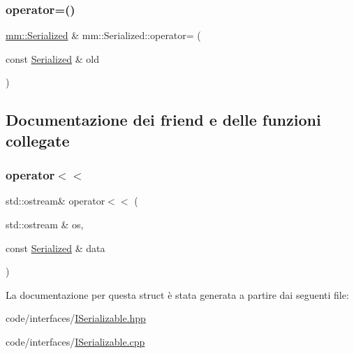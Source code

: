 \mbox{\label{structmm_1_1_serialized_a7d108150308172857962c61c94f78fbd}} 
\subsubsection{\texorpdfstring{operator=()}{operator=()}}
{\footnotesize\ttfamily \mbox{\hyperlink{structmm_1_1_serialized}{mm\+::\+Serialized}} \& mm\+::\+Serialized\+::operator= (\begin{DoxyParamCaption}\item[{const \mbox{\hyperlink{structmm_1_1_serialized}{Serialized}} \&}]{old }\end{DoxyParamCaption})}



\subsection{Documentazione dei friend e delle funzioni collegate}
\mbox{\label{structmm_1_1_serialized_a7ac660741c58dec6ffe85a006b9846ae}} 
\subsubsection{\texorpdfstring{operator$<$$<$}{operator<<}}
{\footnotesize\ttfamily std\+::ostream\& operator$<$$<$ (\begin{DoxyParamCaption}\item[{std\+::ostream \&}]{os,  }\item[{const \mbox{\hyperlink{structmm_1_1_serialized}{Serialized}} \&}]{data }\end{DoxyParamCaption})\hspace{0.3cm}{\ttfamily [friend]}}



La documentazione per questa struct è stata generata a partire dai seguenti file\+:\begin{DoxyCompactItemize}
\item 
code/interfaces/\mbox{\hyperlink{_i_serializable_8hpp}{I\+Serializable.\+hpp}}\item 
code/interfaces/\mbox{\hyperlink{_i_serializable_8cpp}{I\+Serializable.\+cpp}}\end{DoxyCompactItemize}

